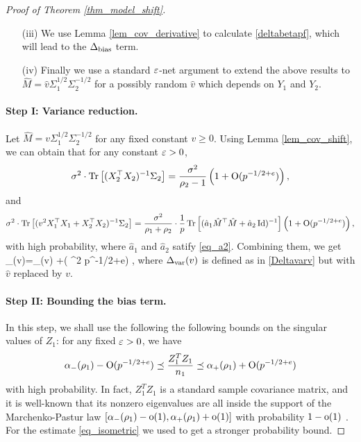 \begin{proof}[Proof of Theorem \ref{thm_model_shift}]
\begin{itemize}
\item[(iii)] We use Lemma \ref{lem_cov_derivative} to calculate \eqref{deltabetapf}, which will lead to the $\Delta_{\text{bias}}$ term.

\item[(iv)] Finally we use a standard ${\varepsilon}$-net argument to extend the above results to $\hat M= \hat v\Sigma_1^{1/2}\Sigma_2^{-1/2}$ for a possibly random $\hat v$ which depends on $Y_1$ and $Y_2$.
\end{itemize}


\paragraph{Step I: Variance reduction.} Let $\hat M= v\Sigma_1^{1/2}\Sigma_2^{-1/2}$ for any fixed constant $v\ge 0$. Using Lemma \ref{lem_cov_shift}, we can obtain that for any constant ${\varepsilon}>0$, 
$$  \sigma^2 \cdot \operatorname{Tr}\left[(X_2^{\top}X_2)^{-1}\Sigma_2\right] = \frac{\sigma^2}{\rho_2-1}\left( 1+ \operatorname{O}(p^{-1/2+e})\right),$$
and 
$$ \sigma^2 \cdot \operatorname{Tr}\left[( {v}^2 X_1^{\top}X_1 + X_2^{\top}X_2)^{-1} \Sigma_2\right] =   \frac {\sigma^2} {\rho_1 + \rho_2}\cdot \frac1p \operatorname{Tr}\left[(\hat a_1 \hat M^{\top}\hat M + \hat a_2\operatorname{Id})^{-1}\right]\left( 1+ \operatorname{O}(p^{-1/2+e})\right) ,$$
with high probability, where $\hat a_1$ and $\hat a_2$ satify \eqref{eq_a2}. Combining them, we get 
\be\label{deltavaral-} \delta_{\vari}(v)=\Delta_{\vari}(v) +\OO( \sigma^2 p^{-1/2+e}) \quad {},
\ee 
where $\Delta_{\text{var}}(v)$ is defined as in \eqref{Deltavarv} but with $\hat v$ replaced by $v$.



\paragraph{Step II: Bounding the bias term.}
In this step, we shall use the following the following bounds on the singular values of $Z_1$: for any fixed ${\varepsilon}>0$, we have
\begin{align}
\alpha_-(\rho_1) - \operatorname{O}(p^{-1/2+e})  \preceq \frac{Z_1^T Z_1}{n_1}  \preceq   \alpha_+(\rho_1) + \operatorname{O}(p^{-1/2+e})   \label{eq_isometric}
\end{align}
with high probability. In fact, $Z_1^TZ_1$ is a standard sample covariance matrix, and it is well-known that its nonzero eigenvalues are all inside the support of the Marchenko-Pastur law $[\alpha_-(\rho_1)-\operatorname{o}(1) ,\alpha_+(\rho_1)+\operatorname{o}(1)]$ with probability $1-\operatorname{o}(1)$ \cite{No_outside}. For the estimate \eqref{eq_isometric} we used \cite[Theorem 2.10]{isotropic} to get a stronger probability bound.



\end{proof}
